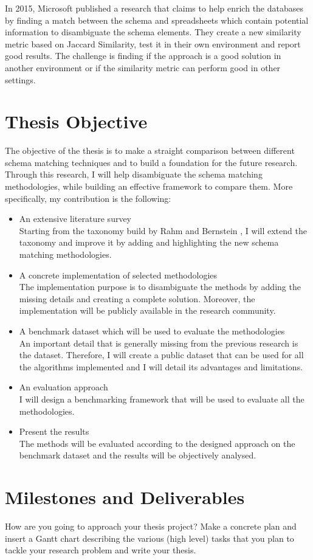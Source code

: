 \documentclass[a4paper]{article}
\begin{document}
In 2015, Microsoft \cite{cortez2015annotating} published a research that claims to help enrich the databases by finding a match between the schema and spreadsheets which contain potential information to disambiguate the schema elements. They create a new similarity metric based on Jaccard Similarity, test it in their own environment and report good results. The challenge is finding if the approach is a good solution in another environment or if the similarity metric can perform good in other settings. 


\section{Thesis Objective}

The objective of the thesis is to make a straight comparison between different schema matching techniques and to build a foundation for the future research. Through this research, I will help disambiguate the schema matching methodologies, while building an effective framework to compare them. More specifically, my contribution is the following: 

\begin{itemize}
	\item An extensive literature survey \\
	Starting from the taxonomy build by Rahm and Bernstein \cite{rahm2001survey}, I will extend the taxonomy and improve it by adding and highlighting the new schema matching methodologies.
	\item A concrete implementation of selected methodologies \\
	The implementation purpose is to disambiguate the methods by adding the missing details and creating a complete solution. Moreover, the implementation will be publicly available in the research community. 
	\item A benchmark dataset which will be used to evaluate the methodologies \\
	An important detail that is generally missing from the previous research is the dataset. Therefore, I will create a public dataset that can be used for all the algorithms implemented and I will detail its advantages and limitations.
	\item An evaluation approach \\
	I will design a benchmarking framework that will be used to evaluate all the methodologies. 
	\item Present the results \\
	The methods will be evaluated according to the designed approach on the benchmark dataset and the results will be objectively analysed. 
\end{itemize}

\section{Milestones and Deliverables}
How are you going to approach your thesis project? Make a concrete plan and insert a Gantt chart describing the various (high level) tasks that you plan to tackle your research problem and write your thesis. 


\printbibliography[heading=bibintoc]

\end{document}

